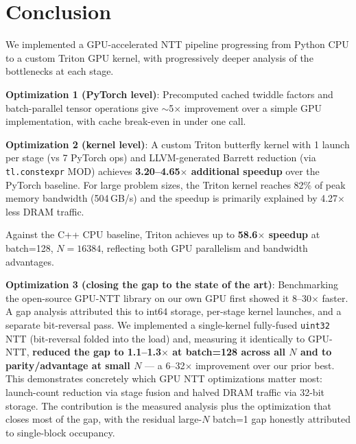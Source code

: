 \documentclass[11pt,a4paper]{article}
\begin{document}
\section{Conclusion}

We implemented a GPU-accelerated NTT pipeline progressing from Python CPU to a custom
Triton GPU kernel, with progressively deeper analysis of the bottlenecks at each stage.

\textbf{Optimization 1 (PyTorch level)}: Precomputed cached twiddle factors and
batch-parallel tensor operations give $\sim$5$\times$ improvement over a simple GPU
implementation, with cache break-even in under one call.

\textbf{Optimization 2 (kernel level)}: A custom Triton butterfly kernel with 1 launch
per stage (vs 7 PyTorch ops) and LLVM-generated Barrett reduction (via \texttt{tl.constexpr}
MOD) achieves \textbf{3.20--4.65$\times$ additional speedup} over the PyTorch baseline.
For large problem sizes, the Triton kernel reaches 82\% of peak memory bandwidth (504\,GB/s)
and the speedup is primarily explained by 4.27$\times$ less DRAM traffic.

Against the C++ CPU baseline, Triton achieves up to \textbf{58.6$\times$ speedup} at
batch=128, $N=16384$, reflecting both GPU parallelism and bandwidth advantages.

\textbf{Optimization 3 (closing the gap to the state of the art)}: Benchmarking the open-source
GPU-NTT library on our own GPU first showed it 8--30$\times$ faster. A gap analysis attributed
this to int64 storage, per-stage kernel launches, and a separate bit-reversal pass. We
implemented a single-kernel fully-fused \texttt{uint32} NTT (bit-reversal folded into the load)
and, measuring it identically to GPU-NTT, \textbf{reduced the gap to 1.1--1.3$\times$ at batch=128
across all $N$ and to parity/advantage at small $N$} --- a 6--32$\times$ improvement over our prior
best. This demonstrates concretely which GPU NTT optimizations matter most: launch-count
reduction via stage fusion and halved DRAM traffic via 32-bit storage. The contribution is the
measured analysis plus the optimization that closes most of the gap, with the residual large-$N$
batch=1 gap honestly attributed to single-block occupancy.
\end{document}
